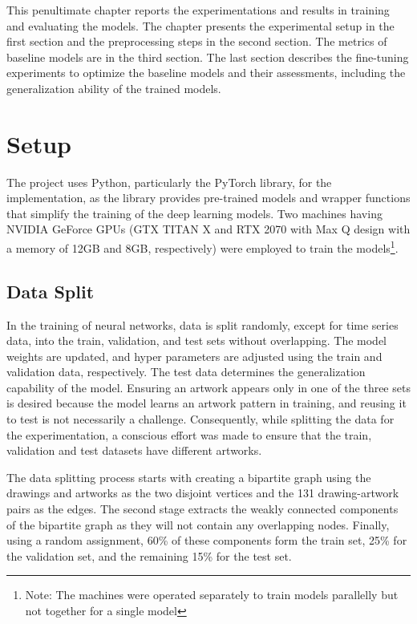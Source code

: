 This penultimate chapter reports the experimentations and results in training and evaluating the models. The chapter presents the experimental setup in the first section and the preprocessing steps in the second section. The metrics of baseline models are in the third section. The last section describes the fine-tuning experiments to optimize the baseline models and their assessments, including the generalization ability of the trained models.

\section{Setup}\label{chap:5:setup}

The project uses Python, particularly the PyTorch library, for the implementation, as the library provides pre-trained models and wrapper functions that simplify the training of the deep learning models. Two machines having NVIDIA GeForce GPUs (GTX TITAN X and RTX 2070 with Max Q design with a memory of 12GB and 8GB, respectively) were employed to train the models\footnote{Note: The machines were operated separately to train models parallelly but not together for a single model}.

\subsection{Data Split}

In the training of neural networks, data is split randomly, except for time series data, into the train, validation, and test sets without overlapping. The model weights are updated, and hyper parameters are adjusted using the train and validation data, respectively. The test data determines the generalization capability of the model. Ensuring an artwork appears only in one of the three sets is desired because the model learns an artwork pattern in training, and reusing it to test is not necessarily a challenge. Consequently, while splitting the data for the experimentation, a conscious effort was made to ensure that the train, validation and test datasets have different artworks.

The data splitting process starts with creating a bipartite graph using the drawings and artworks as the two disjoint vertices and the 131 drawing-artwork pairs as the edges. The second stage extracts the weakly connected components of the bipartite graph as they will not contain any overlapping nodes. Finally, using a random assignment, 60\% of these components form the train set, 25\% for the validation set, and the remaining 15\% for the test set.
 
